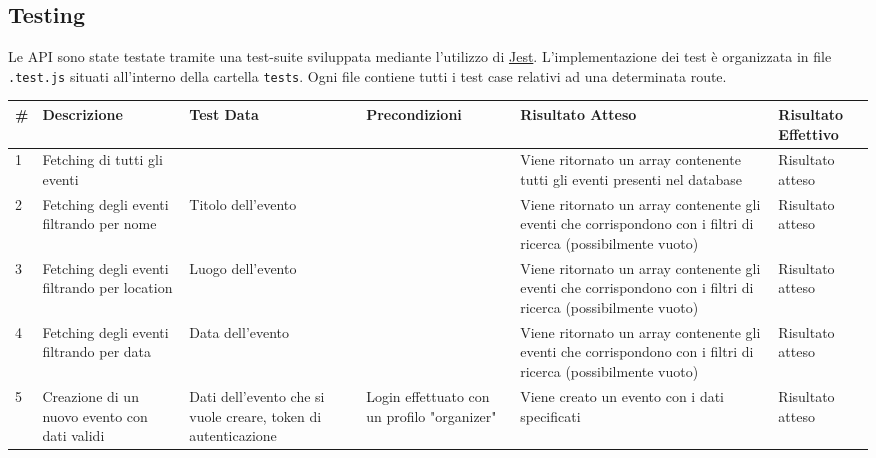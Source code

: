 \documentclass[9pt]{extarticle}
\begin{document}
\newpage
\subsection{Testing}

Le API sono state testate tramite una test-suite sviluppata mediante l'utilizzo di \href{https://jestjs.io/}{Jest}. L’implementazione dei test è organizzata in file \verb|.test.js| situati all'interno della cartella \verb*|tests|. Ogni file contiene tutti i test case relativi ad una determinata route.


\begin{table}[!htb]
	\centering
	\renewcommand{\arraystretch}{1.7} %
	\setlength{\tabcolsep}{6pt} %
	\resizebox{\textwidth}{!}
	{%
	\begin{tabular}{p{.5cm} p{3.5cm} p{2.5cm} p{2.5cm} p{5cm} p{1.5cm}}
		\toprule
		\rowcolor{gray!20}
		\# & Descrizione & Test Data & Precondizioni & Risultato Atteso & Risultato Effettivo \\ \midrule
		1 & Fetching di tutti gli eventi                                                 &                                                               &                                             & Viene ritornato un array contenente tutti gli eventi presenti nel database                                     & Risultato atteso      \\\midrule
		2 & Fetching degli eventi filtrando per nome                                     & Titolo dell'evento                                            &                                             & Viene ritornato un array contenente gli eventi che corrispondono con i filtri di ricerca (possibilmente vuoto) & Risultato atteso      \\\midrule
		3 & Fetching degli eventi filtrando per location                                 & Luogo dell'evento                                             &                                             & Viene ritornato un array contenente gli eventi che corrispondono con i filtri di ricerca (possibilmente vuoto) & Risultato atteso      \\\midrule
		4 & Fetching degli eventi filtrando per data                                     & Data dell'evento                                              &                                             & Viene ritornato un array contenente gli eventi che corrispondono con i filtri di ricerca (possibilmente vuoto) & Risultato atteso      \\\midrule
		5 & Creazione di un nuovo evento con dati validi                                 & Dati dell'evento che si vuole creare, token di autenticazione & Login effettuato con un profilo "organizer" & Viene creato un evento con i dati specificati                                                                  & Risultato atteso      \\\midrule

\end{tabular}}
\end{table}
\end{document}
